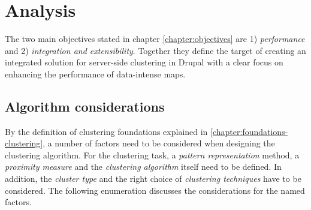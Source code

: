 
%
%

\section{Analysis}
\label{chapter:analysis}

The two main objectives stated in chapter \ref{chapter:objectives} are 1) \textit{performance} and 2) \textit{integration and extensibility}. Together they define the target of creating an integrated solution for server-side clustering in Drupal with a clear focus on enhancing the performance of data-intense maps.


\subsection{Algorithm considerations}

By the definition of clustering foundations explained in \ref{chapter:foundations-clustering}, a number of factors need to be considered when designing the clustering algorithm. For the clustering task, a \textit{pattern representation} method, a \textit{proximity measure} and the \textit{clustering algorithm} itself need to be defined. In addition, the \textit{cluster type} and the right choice of \textit{clustering techniques} have to be considered. The following enumeration discusses the considerations for the named factors. 

